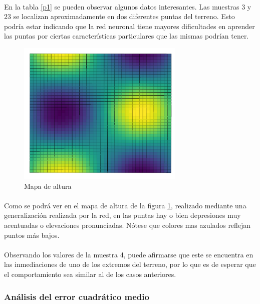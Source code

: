 \documentclass[12pt, twocolumn]{article}
\begin{document}
	\paragraph{} En la tabla \ref{p1} se pueden observar algunos datos interesantes. Las muestras $3$ y $23$ se localizan aproximadamente en dos diferentes puntas del terreno. Esto podría estar indicando que la red neuronal tiene mayores dificultades en aprender las puntas por ciertas características particulares que las mismas podrían tener.
	
	\begin{figure}[H]
		\centering
		\includegraphics[width=8cm]{../results/heightmap.png}
		\caption{Mapa de altura}
		\label{heightmap}
	\end{figure}
	
	\paragraph{} Como se podrá ver en el mapa de altura de la figura \ref{heightmap}, realizado mediante una generalización realizada por la red, en las puntas hay o bien depresiones muy acentuadas o elevaciones pronunciadas. Nótese que colores mas azulados reflejan puntos más bajos. 
	
	\paragraph{} Observando los valores de la muestra 4, puede afirmarse que este se encuentra en las inmediaciones de uno de los extremos del terreno, por lo que es de esperar que el comportamiento sea similar al de los casos anteriores.
	
	\subsubsection{Análisis del error cuadrático medio}
	
\end{document}
